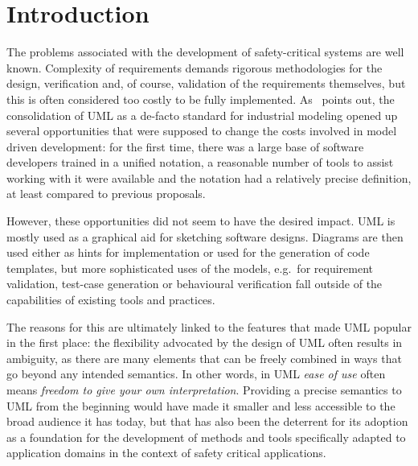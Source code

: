\section{Introduction}
\label{sec:intro}

The problems associated with the development of safety-critical
systems are well known. 
Complexity of requirements demands rigorous methodologies for the design,
verification and, of course, validation of the requirements
themselves, but this is often considered too costly to be fully 
implemented. 
As~\cite{juerjens_houmb_2003_dependable_computing} points out, the
consolidation of UML as a de-facto standard for industrial modeling
opened up several opportunities that were supposed to change the costs
involved in model driven development: for the first time, there was a
large base of software developers trained in a unified notation, a
reasonable number of tools to assist working with it were available
and the notation had a relatively precise definition, at least
compared to previous proposals.

However, these opportunities did not seem to have the desired impact.
UML is mostly used as a graphical aid for sketching software designs. 
Diagrams are then used either as hints for implementation or used for
the generation of code templates, but more sophisticated uses of the
models, e.g.~for requirement validation, test-case generation or
behavioural verification fall outside of the capabilities of existing
tools and practices.

The reasons for this are ultimately linked to the features that made
UML popular in the first place: the flexibility advocated by the
design of UML often results in ambiguity, as there are many elements
that can be freely combined in ways that go beyond any intended
semantics. In other words, in UML \emph{ease of use} often means
\emph{freedom to give your own interpretation}.
Providing a precise semantics to UML from the beginning would have
made it smaller and less accessible to the broad audience it has
today, but that has also been the deterrent for its adoption as a
foundation for the development of methods and tools specifically
adapted to application domains in the context of safety critical
applications. 

